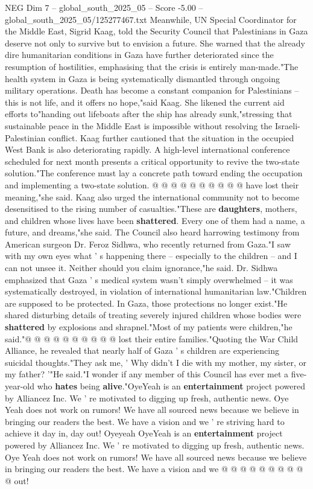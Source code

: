 \begin{textsample}{NEG Dim 7 – global\_south\_2025\_05 – Score -5.00 – global\_south\_2025\_05/125277467.txt}  \label{ex:f7_neg_217}
Meanwhile, UN Special Coordinator for the Middle East, Sigrid Kaag, told the Security Council that Palestinians in Gaza deserve not only to survive but to envision a future.
She warned that the already dire humanitarian conditions in Gaza have further deteriorated since the resumption of hostilities, emphasising that the crisis is entirely man-made."The health system in Gaza is being systematically dismantled through ongoing military operations.
Death has become a constant companion for Palestinians -- this is not life, and it offers no hope,"said Kaag.
She likened the current aid efforts to"handing out lifeboats after the ship has already sunk,"stressing that sustainable peace in the Middle East is impossible without resolving the Israeli-Palestinian conflict.
Kaag further cautioned that the situation in the occupied West Bank is also deteriorating rapidly.
A high-level international conference scheduled for next month presents a critical opportunity to revive the two-state solution."The conference must lay a concrete path toward ending the occupation and implementing a two-state solution. @ @ @ @ @ @ @ @ @ @ have lost their meaning,"she said.
Kaag also urged the international community not to become desensitised to the rising number of casualties."These are \textbf{daughters}, mothers, and children whose lives have been \textbf{shattered}.
Every one of them had a name, a future, and dreams,"she said.
The Council also heard harrowing testimony from American surgeon Dr.
Feroz Sidhwa, who recently returned from Gaza."I saw with my own eyes what ' s happening there -- especially to the children -- and I can not unsee it.
Neither should you claim ignorance,"he said.
Dr.
Sidhwa emphasized that Gaza ' s medical system wasn't simply overwhelmed -- it was systematically destroyed, in violation of international humanitarian law."Children are supposed to be protected.
In Gaza, those protections no longer exist."He shared disturbing details of treating severely injured children whose bodies were \textbf{shattered} by explosions and shrapnel."Most of my patients were children,"he said."@ @ @ @ @ @ @ @ @ @ lost their entire families."Quoting the War Child Alliance, he revealed that nearly half of Gaza ' s children are experiencing suicidal thoughts."They ask me, ' Why didn't I die with my mother, my sister, or my father? '"He said."I wonder if any member of this Council has ever met a five-year-old who \textbf{hates} being \textbf{alive}."OyeYeah is an \textbf{entertainment} project powered by Alliancez Inc.
We ' re motivated to digging up fresh, authentic news.
Oye Yeah does not work on rumors!
We have all sourced news because we believe in bringing our readers the best.
We have a vision and we ' re striving hard to achieve it day in, day out!
Oyeyeah OyeYeah is an \textbf{entertainment} project powered by Alliancez Inc.
We ' re motivated to digging up fresh, authentic news.
Oye Yeah does not work on rumors!
We have all sourced news because we believe in bringing our readers the best.
We have a vision and we @ @ @ @ @ @ @ @ @ @ out!

\end{textsample}
